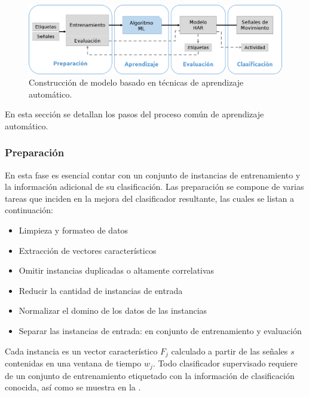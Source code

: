 \begin{figure}[H]
\begin{centering}
\includegraphics[width=1\columnwidth]{capitulo-4/graphics/clasificacion}
\par\end{centering}
\caption[Modelo de aprendizaje automático]{\label{fig4:clasificador}Construcción de modelo  basado
en técnicas de aprendizaje automático.}
\end{figure}

En esta sección se detallan los pasos del proceso común de aprendizaje
automático.

\subsubsection{Preparación}

En esta fase es esencial contar con un conjunto de instancias de entrenamiento
y la información adicional de su clasificación. Las preparación se
compone de varias tareas que inciden en la mejora del clasificador
resultante, las cuales se listan a continuación:
\begin{itemize}
\item Limpieza y formateo de datos
\item Extracción de vectores característicos
\item Omitir instancias duplicadas o altamente correlativas
\item Reducir la cantidad de instancias de entrada
\item Normalizar el domino de los datos de las instancias
\item Separar las instancias de entrada: en conjunto de entrenamiento y
evaluación
\end{itemize}
Cada instancia es un vector característico $F_{j}$ calculado a partir
de las señales $s$ contenidas en una ventana de tiempo $w_{j}$.
Todo clasificador supervisado requiere de un conjunto de entrenamiento
etiquetado con la información de clasificación conocida, así como
se muestra en la . 

